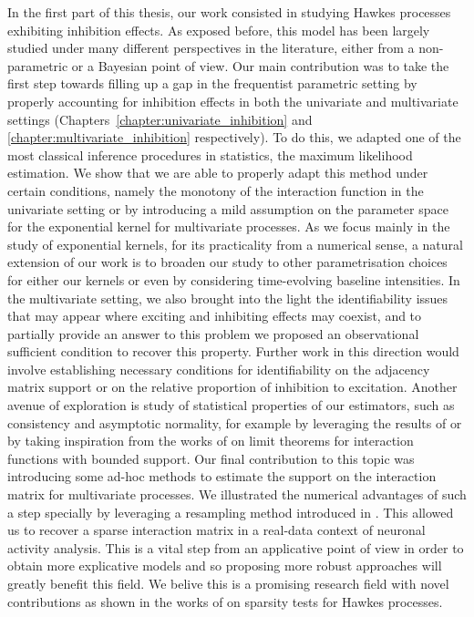In the first part of this thesis, our work consisted in studying Hawkes processes exhibiting inhibition effects.
As exposed before, this model has been largely studied under many different perspectives in the literature, either from a non-parametric or a Bayesian point of view.
Our main contribution was to take the first step towards filling up a gap in the frequentist parametric setting by properly accounting for inhibition effects in both the univariate and multivariate settings (Chapters~\ref{chapter:univariate_inhibition} and \ref{chapter:multivariate_inhibition} respectively).
To do this, we adapted one of the most classical inference procedures in statistics, the maximum likelihood estimation.
We show that we are able to properly adapt this method under certain conditions, namely the monotony of the interaction function in the univariate setting or by introducing a mild assumption on the parameter space for the exponential kernel for multivariate processes.
As we focus mainly in the study of exponential kernels, for its practicality from a numerical sense, a natural extension of our work is to broaden our study to other parametrisation choices for either our kernels or even by considering time-evolving baseline intensities.
In the multivariate setting, we also brought into the light the identifiability issues that may appear where exciting and inhibiting effects may coexist, and to partially provide an answer to this problem we proposed an observational sufficient condition to recover this property.
Further work in this direction would involve establishing necessary conditions for identifiability on the adjacency matrix support or on the relative proportion of inhibition to excitation.
Another avenue of exploration is study of statistical properties of our estimators, such as consistency and asymptotic normality, for example by leveraging the results of \textcite{Ogata1978} or by taking inspiration from the works of \textcite{Costa2020} on limit theorems for interaction functions with bounded support.
Our final contribution to this topic was introducing some ad-hoc methods to estimate the support on the interaction matrix for multivariate processes. 
We illustrated the numerical advantages of such a step specially by leveraging a resampling method introduced in \textcite{Reynaud2014}.
This allowed us to recover a sparse interaction matrix in a real-data context of neuronal activity analysis.
This is a vital step from an applicative point of view in order to obtain more explicative models and so proposing more robust approaches will greatly benefit this field.
We belive this is a promising research field with novel contributions as shown in the works of \textcite{Lotz2024} on sparsity tests for Hawkes processes.

